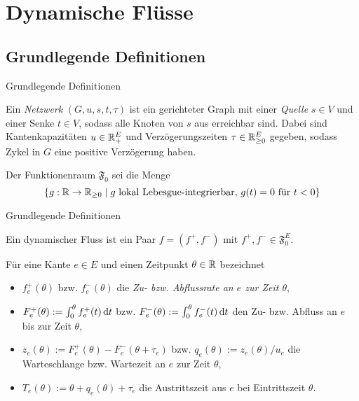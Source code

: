 \section{Dynamische Flüsse}
\subsection{Grundlegende Definitionen}

\begin{frame}{Grundlegende Definitionen}
	\begin{definition}[Netzwerk]
		Ein \emph{Netzwerk} $(G, u, s, t, \tau)$ ist ein gerichteter Graph mit einer \emph{Quelle} $s\in V$ und einer Senke $t\in V$, sodass alle Knoten von $s$ aus erreichbar sind.
		Dabei sind Kantenkapazitäten $u \in\mathbb{R}_+^E$ und Verzögerungszeiten $\tau\in\mathbb{R}_{\geq 0}^E$ gegeben, sodass Zykel in $G$ eine positive Verzögerung haben.
	\end{definition}
	
	\begin{definition}
		Der Funktionenraum $\mathfrak{F}_0$ sei die Menge
		\[ \{ g: \mathbb{R}\to\mathbb{R}_{\geq 0} \mid \text{$g$ lokal Lebesgue-integrierbar, $g(t) = 0$ für $t<0$} \} \]
	\end{definition}
\end{frame}


\begin{frame}{Grundlegende Definitionen}
	\begin{definition}
		Ein dynamischer Fluss ist ein Paar $f=(f^+, f^-)$ mit $f^+, f^-\in\mathfrak{F}_0^E$.
		
		Für eine Kante $e\in E$ und einen Zeitpunkt $\theta\in\mathbb{R}$ bezeichnet
		\begin{itemize}[label=$\color{darkblue}\bullet$]
			\item $f_e^+(\theta)$ bzw. $f_e^-(\theta)$ die \emph{Zu- bzw. Abflussrate an $e$ zur Zeit $\theta$},
			\item $F_e^+(\theta) := \int_0^\theta f^+_e(t) \mathop{}\!\mathrm{d} t$ bzw. $F^-_e(\theta):=\int_0^\theta f^-_e(t)\mathop{}\!\mathrm{d} t$ den Zu- bzw. Abfluss an $e$ bis zur Zeit $\theta$,
			\item $z_e(\theta):= F_e^+(\theta) - F_e^-(\theta + \tau_e)$ bzw. $q_e(\theta):= z_e(\theta)/u_e$ die Warteschlange bzw. Wartezeit an $e$ zur Zeit $\theta$,
			\item $T_e(\theta):=\theta + q_e(\theta) + \tau_e$ die Austrittszeit aus $e$ bei Eintrittszeit $\theta$.
		\end{itemize}	
	\end{definition}
\end{frame}


